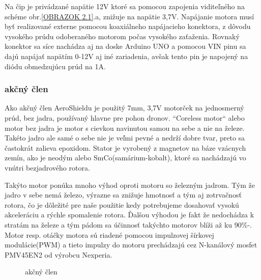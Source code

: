 Na čip je privádzané napätie 12V ktoré sa pomocou zapojenia viditeľného na schéme obr.\ref{OBRAZOK 2.1}.a, znižuje na napätie 3,7V. Napájanie motora musí byť realizované externe pomocou koaxiálneho napájacieho konektora, z dôvodu vysokého prúdu odoberaného motorom počas vysokého zaťaženia. Rovnaký konektor sa síce nachádza aj na doske Arduino UNO a pomocou VIN pinu sa dajú napájať napätím 0-12V aj iné zariadenia, avšak tento pin je napojený na diódu obmedzujúcu prúd na 1A\cite{ampere}\cite{ampere2}.



\subsubsection{akčný člen}
\label{akcclen}

Ako akčný člen AeroShieldu je použitý 7mm, 3,7V motorček na jednosmerný prúd, bez jadra, používaný hlavne pre pohon dronov. “Coreless motor“ alebo motor bez jadra je motor s cievkou navinutou samou na sebe a nie na železe\cite{coreless}. Takéto jadro ale samé o sebe nie je veľmi pevné a nedrží dobre tvar, preto sa častokrát zalieva epoxidom. Stator je vyrobený z magnetov na báze vzácnych zemín, ako je neodým alebo SmCo(samárium-kobalt), ktoré sa nachádzajú vo vnútri bezjadrového rotora.

Takýto motor ponúka mnoho výhod oproti motoru so železným jadrom. Tým že jadro v sebe nemá železo, výrazne sa znižuje hmotnosť a tým aj zotrvačnosť rotora, čo je dôležité pre naše použitie kedy potrebujeme dosahovať vysokú akceleráciu a rýchle spomalenie rotora. Ďalšou výhodou je fakt že nedochádza k stratám na železe a tým pádom sa účinnosť takýchto motorov blíži až ku 90\%-\cite{5545147}. Motor resp. otáčky motora sú riadené pomocou impulzovej šírkovej modulácie(PWM) a tieto impulzy do motoru prechádzajú cez N-kanálový mosfet PMV45EN2 od výrobcu Nexperia\cite{pmv}.



\begin{figure}[!tbh]
	\hfill
	\hfill
	\hfill
	\caption{akčný člen}\label{OBRAZOK 2.3}
\end{figure}


